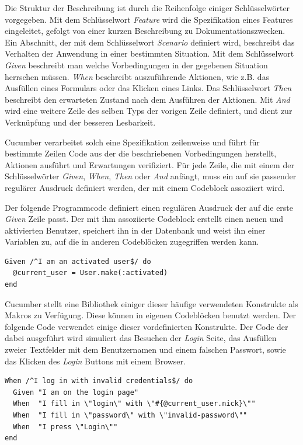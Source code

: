 Die Struktur der Beschreibung ist durch die Reihenfolge einiger
Schlüssel\-wörter vorgegeben. Mit dem Schlüsselwort \textit{Feature}
wird die Spezifikation eines Features eingeleitet, gefolgt von einer
kurzen Beschreibung zu Dokumentationszwecken. Ein Abschnitt, der mit
dem Schlüsselwort \textit{Scenario} definiert wird, beschreibt das
Verhalten der Anwendung in einer bestimmten Situation. Mit dem
Schlüsselwort \textit{Given} beschreibt man welche Vorbedingungen in
der gegebenen Situation herrschen müssen. \textit{When} beschreibt
auszuführende Aktionen, wie z.B. das Ausfüllen eines Formulars oder
das Klicken eines Links. Das Schlüsselwort \textit{Then} beschreibt
den erwarteten Zustand nach dem Ausführen der Aktionen. Mit
\textit{And} wird eine weitere Zeile des selben Typs der vorigen Zeile
definiert, und dient zur Verknüpfung und der besseren Lesbarkeit.

Cucumber verarbeitet solch eine Spezifikation zeilenweise und führt
für bestimmte Zeilen Code aus der die beschriebenen Vorbedingungen
herstellt, Aktionen ausführt und Erwartungen verifiziert. Für jede
Zeile, die mit einem der Schlüsselwörter \textit{Given},
\textit{When}, \textit{Then} oder \textit{And} anfängt, muss ein auf
sie passender regulärer Ausdruck definiert werden, der mit einem
Codeblock assoziiert wird.

Der folgende Programmcode definiert einen regulären Ausdruck der auf
die erste \textit{Given} Zeile passt. Der mit ihm assoziierte Codeblock
erstellt einen neuen und aktivierten Benutzer, speichert ihn in der
Datenbank und weist ihn einer Variablen zu, auf die in anderen
Codeblöcken zugegriffen werden kann.

\begin{lstlisting}
Given /^I am an activated user$/ do
  @current_user = User.make(:activated)
end
\end{lstlisting}

Cucumber stellt eine Bibliothek einiger dieser häufige verwendeten
Konstrukte als Makros zu Verfügung. Diese können in eigenen
Codeblöcken benutzt werden. Der folgende Code verwendet einige dieser
vordefinierten Konstrukte. Der Code der dabei ausgeführt wird
simuliert das Besuchen der \textit{Login} Seite, das Ausfüllen zweier
Textfelder mit dem Benutzernamen und einem falschen Passwort, sowie
das Klicken des \textit{Login} Buttons mit einem Browser.

\begin{lstlisting}
When /^I log in with invalid credentials$/ do
  Given "I am on the login page"
  When  "I fill in \"login\" with \"#{@current_user.nick}\""
  When  "I fill in \"password\" with \"invalid-password\""
  When  "I press \"Login\""
end
\end{lstlisting}


